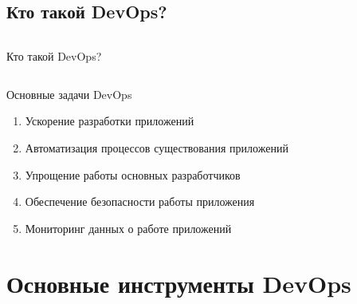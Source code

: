 \documentclass [8pt] {beamer}
\begin{document}
\subsection{Кто такой DevOps?}
\begin{frame}
\begin{columns}[T]
\vskip2.2cm
\centering
\huge
Кто такой DevOps?
\begin{figure}[H]
\end{figure}
\end{columns}
\end{frame}

\begin{frame}
\Huge

Основные задачи DevOps
\vskip0.25cm
\Large

\begin{enumerate}
\item Ускорение разработки приложений
\item Автоматизация процессов существования приложений
\item Упрощение работы основных разработчиков
\item Обеспечение безопасности работы приложения
\item Мониторинг данных о работе приложений
\end{enumerate}
\end{frame}

\section{Основные инструменты DevOps}
\end{document}
